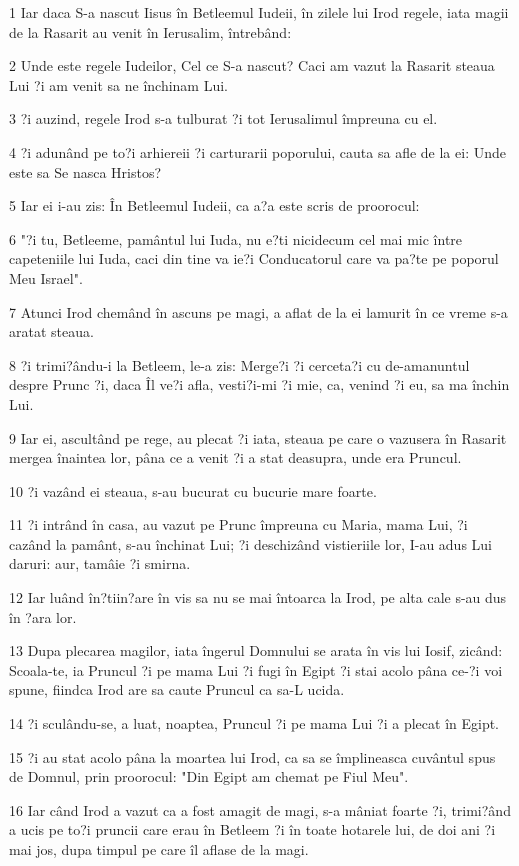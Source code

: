 \par 1 Iar daca S-a nascut Iisus în Betleemul Iudeii, în zilele lui Irod regele, iata magii de la Rasarit au venit în Ierusalim, întrebând:
\par 2 Unde este regele Iudeilor, Cel ce S-a nascut? Caci am vazut la Rasarit steaua Lui ?i am venit sa ne închinam Lui.
\par 3 ?i auzind, regele Irod s-a tulburat ?i tot Ierusalimul împreuna cu el.
\par 4 ?i adunând pe to?i arhiereii ?i carturarii poporului, cauta sa afle de la ei: Unde este sa Se nasca Hristos?
\par 5 Iar ei i-au zis: În Betleemul Iudeii, ca a?a este scris de proorocul:
\par 6 "?i tu, Betleeme, pamântul lui Iuda, nu e?ti nicidecum cel mai mic între capeteniile lui Iuda, caci din tine va ie?i Conducatorul care va pa?te pe poporul Meu Israel".
\par 7 Atunci Irod chemând în ascuns pe magi, a aflat de la ei lamurit în ce vreme s-a aratat steaua.
\par 8 ?i trimi?ându-i la Betleem, le-a zis: Merge?i ?i cerceta?i cu de-amanuntul despre Prunc ?i, daca Îl ve?i afla, vesti?i-mi ?i mie, ca, venind ?i eu, sa ma închin Lui.
\par 9 Iar ei, ascultând pe rege, au plecat ?i iata, steaua pe care o vazusera în Rasarit mergea înaintea lor, pâna ce a venit ?i a stat deasupra, unde era Pruncul.
\par 10 ?i vazând ei steaua, s-au bucurat cu bucurie mare foarte.
\par 11 ?i intrând în casa, au vazut pe Prunc împreuna cu Maria, mama Lui, ?i cazând la pamânt, s-au închinat Lui; ?i deschizând vistieriile lor, I-au adus Lui daruri: aur, tamâie ?i smirna.
\par 12 Iar luând în?tiin?are în vis sa nu se mai întoarca la Irod, pe alta cale s-au dus în ?ara lor.
\par 13 Dupa plecarea magilor, iata îngerul Domnului se arata în vis lui Iosif, zicând: Scoala-te, ia Pruncul ?i pe mama Lui ?i fugi în Egipt ?i stai acolo pâna ce-?i voi spune, fiindca Irod are sa caute Pruncul ca sa-L ucida.
\par 14 ?i sculându-se, a luat, noaptea, Pruncul ?i pe mama Lui ?i a plecat în Egipt.
\par 15 ?i au stat acolo pâna la moartea lui Irod, ca sa se împlineasca cuvântul spus de Domnul, prin proorocul: "Din Egipt am chemat pe Fiul Meu".
\par 16 Iar când Irod a vazut ca a fost amagit de magi, s-a mâniat foarte ?i, trimi?ând a ucis pe to?i pruncii care erau în Betleem ?i în toate hotarele lui, de doi ani ?i mai jos, dupa timpul pe care îl aflase de la magi.
